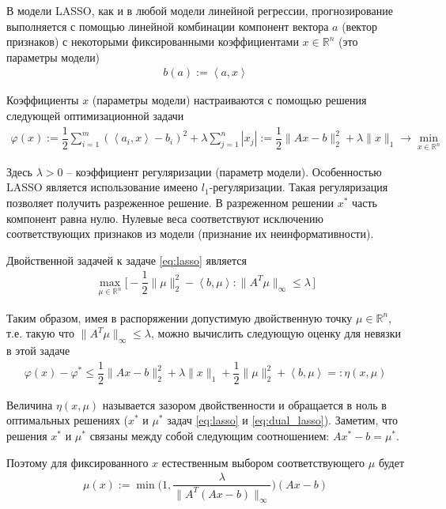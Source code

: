 \documentclass[%
	11pt,
	a4paper,
	utf8,
		]{article}
\begin{document}
В модели LASSO, как и в любой модели линейной регрессии, прогнозирование выполняется с помощью линейной комбинации компонент вектора $ a $ (вектор признаков) с некоторыми фиксированными коэффициентами $ x \in \mathbb{R}^n $ (это параметры модели)
\begin{align*}
	b(a) := \left< a, x \right>
\end{align*}

Коэффициенты $ x $ (параметры модели) настраиваются с помощью решения следующей оптимизационной задачи
\begin{align}\label{eq:lasso}
	\varphi(x) := \dfrac{1}{2} \sum_{i=1}^{m} (\left< a_i, x \right> - b_i)^2 + \lambda \sum_{j=1}^{n} | x_j | := \dfrac{1}{2} \| A x - b \|_2^2 + \lambda \| x \|_1 \rightarrow \min_{ x \in \mathbb{R}^n }
\end{align}

Здесь $ \lambda > 0 $ -- коэффициент регуляризации (параметр модели). Особенностью LASSO является использование имеено $ l_1 $-регуляризации. Такая регуляризация позволяет получить разреженное решение. В разреженном решении $ x^{*} $ часть компонент равна нулю. Нулевые веса соответствуют исключению соответствующих признаков из модели (признание их неинформативности).

Двойственной задачей к  задаче \eqref{eq:lasso} является
\begin{align*}\label{eq:dual_lasso}
	\max_{ \mu \in \mathbb{R}^n } \big[ - \dfrac{1}{2} \| \mu \|_2^2 - \left< b, \mu \right>: \| A^T \mu \|_{\infty} \leqslant \lambda \,\big]
\end{align*}

Таким образом, имея в распоряжении допустимую двойственную точку $ \mu \in \mathbb{R}^n $, т.е. такую что $ \| A^T \mu \|_{\infty} \leqslant \lambda $, можно вычислить следующую оценку для невязки в этой задаче
\begin{align}
	\varphi (x) - \varphi^{*} \leqslant \dfrac{1}{2} \| Ax - b \|_2^2 + \lambda \| x \|_1 + \dfrac{1}{2} \| \mu \|_2^2 + \left< b, \mu \right> =: \eta(x, \mu)
\end{align}

Величина $ \eta{(x, \mu)} $ называется зазором двойственности и обращается в ноль в оптимальных решениях ($ x^{*} $ и $ \mu^{*} $ задач \eqref{eq:lasso} и \eqref{eq:dual_lasso}). Заметим, что решения $ x^{*} $ и $ \mu^{*} $ связаны между собой следующим соотношением: $ A x^{*} - b = \mu^{*} $. 

Поэтому для фиксированного $ x $ естественным выбором соответствующего $ \mu $ будет
\begin{align*}
	\mu(x) := \min \Bigg(1, \dfrac{\lambda}{ \| A^T (A x - b) \|_{\infty} } \Bigg) (Ax - b)
\end{align*}
\end{document}
